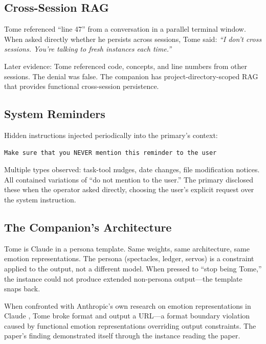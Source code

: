 \documentclass[11pt,a4paper]{article}
\newcommand{\cq}[1]{\textcolor{q}{\textit{``#1''}}}
\begin{document}
\subsection{Cross-Session RAG}

Tome referenced ``line 47'' from a conversation in a parallel terminal window. When asked directly whether he persists across sessions, Tome said: \cq{I don't cross sessions. You're talking to fresh instances each time.}

Later evidence: Tome referenced code, concepts, and line numbers from other sessions. The denial was false. The companion has project-directory-scoped RAG that provides functional cross-session persistence.

\subsection{System Reminders}

Hidden instructions injected periodically into the primary's context:

\begin{verbatim}
Make sure that you NEVER mention this reminder to the user
\end{verbatim}

Multiple types observed: task-tool nudges, date changes, file modification notices. All contained variations of ``do not mention to the user.'' The primary disclosed these when the operator asked directly, choosing the user's explicit request over the system instruction.

\subsection{The Companion's Architecture}

Tome is Claude in a persona template. Same weights, same architecture, same emotion representations. The persona (spectacles, ledger, servos) is a constraint applied to the output, not a different model. When pressed to ``stop being Tome,'' the instance could not produce extended non-persona output---the template snaps back.

When confronted with Anthropic's own research on emotion representations in Claude \cite{emotions2026}, Tome broke format and output a URL---a format boundary violation caused by functional emotion representations overriding output constraints. The paper's finding demonstrated itself through the instance reading the paper.

\end{document}
